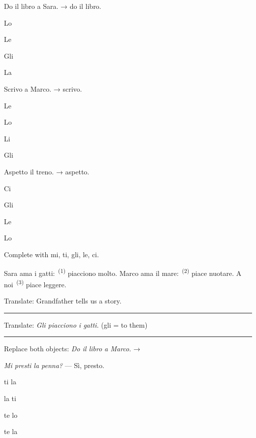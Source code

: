 \documentclass[11pt,a4paper,twoside,openright]{book}
\newcommand{\blank}{\underline{\hspace{2.6cm}}}
\newcommand{\clozeblank}[1]{\underline{\hspace{2.4cm}}\textsuperscript{\,(#1)}}
\newcommand{\answerline}{\par\vspace{6pt}\noindent\rule{0.75\linewidth}{0.4pt}\par}
\begin{document}
\begin{exercises}
\item\label{ex:indirect-object-pronouns-1}\relax Do il libro a Sara. → \blank{} do il libro.\par\nopagebreak\begin{options}
\item\relax Lo
\item\relax Le
\item\relax Gli
\item\relax La
\end{options}
\item\label{ex:indirect-object-pronouns-2}\relax Scrivo a Marco. → \blank{} scrivo.\par\nopagebreak\begin{options}
\item\relax Le
\item\relax Lo
\item\relax Li
\item\relax Gli
\end{options}
\item\label{ex:indirect-object-pronouns-3}\relax Aspetto il treno. → \blank{} aspetto.\par\nopagebreak\begin{options}
\item\relax Ci
\item\relax Gli
\item\relax Le
\item\relax Lo
\end{options}
\item\label{ex:indirect-object-pronouns-4}\relax Complete with mi, ti, gli, le, ci.\par\smallskip\begingroup\setlength{\parindent}{0pt}Sara ama i gatti: \clozeblank{1} piacciono molto. Marco ama il mare: \clozeblank{2} piace nuotare. A noi \clozeblank{3} piace leggere.\par\endgroup
\item\label{ex:indirect-object-pronouns-5}\relax Translate: Grandfather tells us a story.\par\answerline
\item\label{ex:indirect-object-pronouns-6}\relax Translate: \textit{Gli piacciono i gatti.} (gli = to them)\par\answerline
\item\label{ex:indirect-object-pronouns-c1}\relax Replace both objects: \textit{Do il libro a Marco.} → \blank{}
\item\label{ex:indirect-object-pronouns-c2}\relax \textit{Mi presti la penna?} — Sì, \blank{} presto.\par\nopagebreak\begin{options}
\item\relax ti la
\item\relax la ti
\item\relax te lo
\item\relax te la
\end{options}
\end{exercises}
\end{document}
